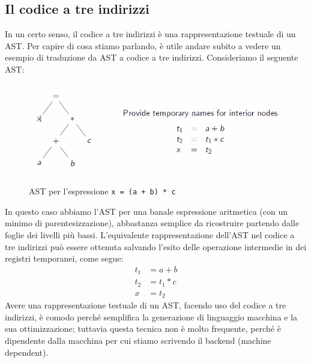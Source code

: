 \documentclass[class=book, crop=false, oneside, 12pt]{standalone}
\begin{document}
\subsection{Il codice a tre indirizzi}
In un certo senso, il codice a tre indirizzi è una rappresentazione testuale di un AST. Per capire di cosa stiamo parlando, è utile andare subito a vedere un esempio di traduzione da AST a codice a tre indirizzi. Consideriamo il seguente AST:
\begin{figure}[H]
    \centering
    \includegraphics[width=.8\textwidth]{ex1.png}
    \caption{AST per l'espressione \texttt{x = (a + b) * c}}
    \label{fig:ast-to-tac-ex1}
\end{figure}
In questo caso abbiamo l'AST per una banale espressione aritmetica (con un minimo di parentesizzazione), abbastanza semplice da ricostruire partendo dalle foglie dei livelli più bassi. L'equivalente rappresentazione dell'AST nel codice a tre indirizzi può essere ottenuta salvando l'esito delle operazione intermedie in dei registri temporanei, come segue:
\begin{align*}
    t_1 &= a + b \\
    t_2 &= t_1 * c \\
    x &= t_2
\end{align*}
Avere una rappresentazione testuale di un AST, facendo uso del codice a tre indirizzi, è comodo perché semplifica la generazione di linguaggio macchina e la sua ottimizzazione; tuttavia questa tecnica non è molto frequente, perché è dipendente dalla macchina per cui stiamo scrivendo il backend (machine dependent).
\end{document}
